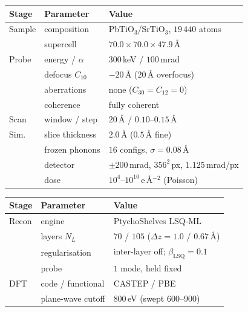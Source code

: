 \documentclass[aps,prb,twocolumn,superscriptaddress,floatfix,nofootinbib]{revtex4-2}
\begin{document}
\begin{table}[t]
  \centering \footnotesize
  \setlength{\tabcolsep}{4pt}      %
  \begin{minipage}[t]{0.495\textwidth}
    \begin{tabular}{@{}lll@{}}
      \toprule
      Stage & Parameter & Value \\
      \midrule
      Sample & composition & PbTiO$_3$/SrTiO$_3$, $19\,440$ atoms \\
             & supercell & $70.0\times70.0\times47.9$\,\AA \\
      \addlinespace
      Probe  & energy / $\alpha$ & $300$\,keV / $100$\,mrad \\
             & defocus $C_{10}$ & $-20$\,\AA{} ($20$\,\AA{} overfocus) \\
             & aberrations & none ($C_{30}=C_{12}=0$) \\
             & coherence & fully coherent \\
      \addlinespace
      Scan   & window / step & $20$\,\AA{} / $0.10$--$0.15$\,\AA \\
      \addlinespace
      Sim.   & slice thickness & $2.0$\,\AA{} ($0.5$\,\AA{} fine) \\
             & frozen phonons & $16$ configs, $\sigma=0.08$\,\AA \\
             & detector & $\pm200$\,mrad, $356^2$\,px, $1.125$\,mrad/px \\
             & dose & $10^{4}$--$10^{10}$\,e\,\AA$^{-2}$ (Poisson) \\
      \bottomrule
    \end{tabular}
  \end{minipage}\hfill
  \begin{minipage}[t]{0.495\textwidth}
    \begin{tabular}{@{}lll@{}}
      \toprule
      Stage & Parameter & Value \\
      \midrule
      Recon  & engine & PtychoShelves LSQ-ML \\
             & layers $N_L$ & $70$ / $105$ ($\Delta z=1.0$ / $0.67$\,\AA) \\
             & regularisation & inter-layer off; $\beta_{\mathrm{LSQ}}=0.1$ \\
             & probe & $1$ mode, held fixed \\
      \addlinespace
      DFT    & code / functional & CASTEP \citep{Clark2005} / PBE \\
             & plane-wave cutoff & $800$\,eV (swept $600$--$900$) \\

\end{tabular}
\end{minipage}
\end{table}
\end{document}
